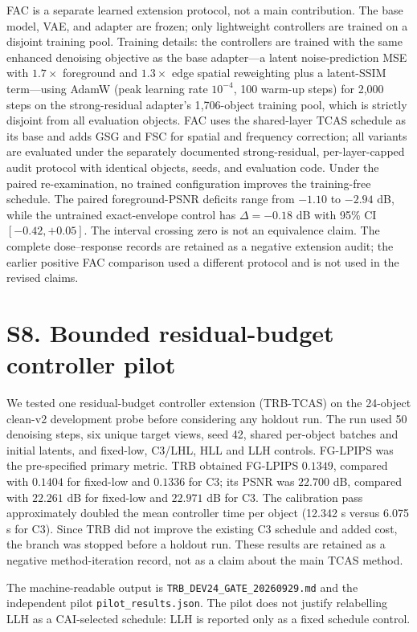 \documentclass[10pt]{article}
\begin{document}
FAC is a separate learned extension protocol, not a main contribution. The
base model, VAE, and adapter are frozen; only lightweight controllers are
trained on a disjoint training pool. Training details: the controllers are
trained with the same enhanced denoising objective as the base adapter---a
latent noise-prediction MSE with $1.7\times$ foreground and $1.3\times$ edge
spatial reweighting plus a latent-SSIM term---using AdamW (peak learning
rate $10^{-4}$, 100 warm-up steps) for 2{,}000 steps on the strong-residual
adapter's 1{,}706-object training pool, which is strictly disjoint from all
evaluation objects. FAC uses the shared-layer TCAS schedule as its base and
adds GSG and FSC for spatial and frequency correction; all variants are
evaluated under the separately documented strong-residual, per-layer-capped
audit protocol with identical objects, seeds, and evaluation code.
Under the paired re-examination, no
trained configuration improves the training-free schedule. The paired
foreground-PSNR deficits range from $-1.10$ to $-2.94$ dB, while the
untrained exact-envelope control has $\Delta=-0.18$ dB with 95\% CI
$[-0.42,+0.05]$. The interval crossing zero is not an equivalence claim.
The complete dose--response records are retained as a negative extension
audit; the earlier positive FAC comparison used a different protocol and is
not used in the revised claims.

\section{S8. Bounded residual-budget controller pilot}

We tested one residual-budget controller extension (TRB-TCAS) on the
24-object clean-v2 development probe before considering any holdout run. The
run used 50 denoising steps, six unique target views, seed 42, shared
per-object batches and initial latents, and fixed-low, C3/LHL, HLL and LLH
controls. FG-LPIPS was the pre-specified primary metric. TRB obtained
FG-LPIPS $0.1349$, compared with $0.1404$ for fixed-low and $0.1336$ for C3;
its PSNR was $22.700$ dB, compared with $22.261$ dB for fixed-low and
$22.971$ dB for C3. The calibration pass approximately doubled the mean
controller time per object (12.342 s versus 6.075 s for C3). Since TRB did
not improve the existing C3 schedule and added cost, the branch was stopped
before a holdout run. These results are retained as a negative method-iteration
record, not as a claim about the main TCAS method.

The machine-readable output is
\texttt{TRB\_DEV24\_GATE\_20260929.md} and the independent pilot
\texttt{pilot\_results.json}. The pilot does not justify relabelling LLH as a
CAI-selected schedule: LLH is reported only as a fixed schedule control.
\end{document}
